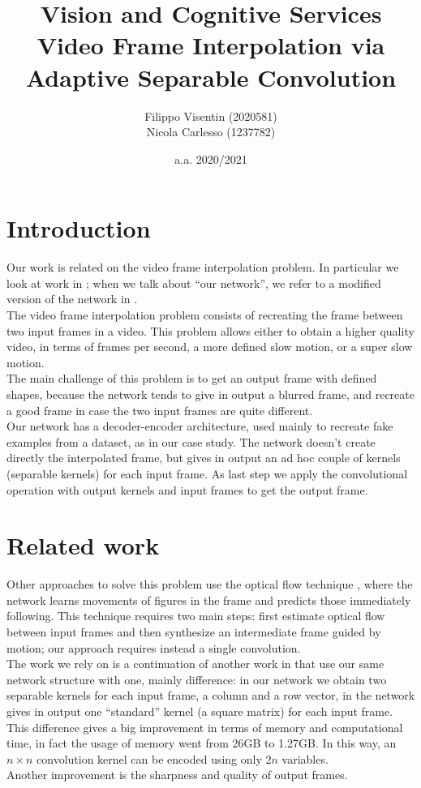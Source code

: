 \documentclass[11pt, a4paper]{article}
\title{Vision and Cognitive Services\\
\large Video Frame Interpolation via Adaptive Separable Convolution}
\author{Filippo Visentin (2020581)\\
Nicola Carlesso (1237782)}
\date{a.a. 2020/2021}
\begin{document}
	\maketitle
	\clearpage
	
	\tableofcontents
	\clearpage
	
	\section{Introduction}
	Our work is related on the video frame interpolation problem. In particular we look at work in \cite{mainpaper}; when we talk about ``our network'', we refer to a modified version of the network in \cite{mainpaper}.\\
	The video frame interpolation problem consists of recreating the frame between two input frames in a video. This problem allows either to obtain a higher quality video, in terms of frames per second, a more defined slow motion, or a super slow motion.\\
	The main challenge of this problem is to get an output frame with defined shapes, because the network tends to give in output a blurred frame, and recreate a good frame in case the two input frames are quite different.\\
	Our network has a decoder-encoder architecture, used mainly to recreate fake examples from a dataset, as in our case study. The network doesn't create directly the interpolated frame, but gives in output an ad hoc couple of kernels (separable kernels) for each input frame. As last step we apply the convolutional operation with output kernels and input frames to get the output frame. 
	
	\section{Related work}
	Other approaches to solve this problem use the optical flow technique \cite{optical_flow}, where the network learns movements of figures in the frame and predicts those immediately following. This technique requires two main steps: first estimate optical flow between input frames and then synthesize an intermediate frame guided by motion; our approach requires instead a single convolution.\\
	The work we rely on is a continuation of another work in \cite{previous_work} that use our same network structure with one, mainly difference: in our network we obtain two separable kernels for each input frame, a column and a row vector, in \cite{previous_work} the network gives in output one ``standard'' kernel (a square matrix) for each input frame. This difference gives a big improvement in terms of memory and computational time, in fact the usage of memory went from 26GB to 1.27GB.  In this way, an $n \times n$ convolution kernel can be encoded using only $2n$ variables.\\
	Another improvement is the sharpness and quality of output frames.
	
\end{document}
